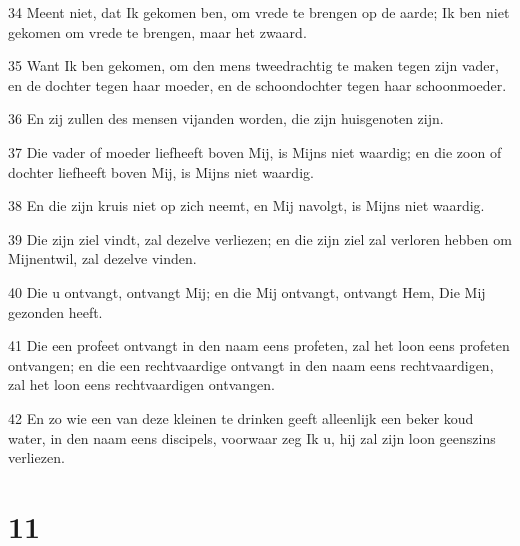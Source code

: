 \par 34 Meent niet, dat Ik gekomen ben, om vrede te brengen op de aarde; Ik ben niet gekomen om vrede te brengen, maar het zwaard.
\par 35 Want Ik ben gekomen, om den mens tweedrachtig te maken tegen zijn vader, en de dochter tegen haar moeder, en de schoondochter tegen haar schoonmoeder.
\par 36 En zij zullen des mensen vijanden worden, die zijn huisgenoten zijn.
\par 37 Die vader of moeder liefheeft boven Mij, is Mijns niet waardig; en die zoon of dochter liefheeft boven Mij, is Mijns niet waardig.
\par 38 En die zijn kruis niet op zich neemt, en Mij navolgt, is Mijns niet waardig.
\par 39 Die zijn ziel vindt, zal dezelve verliezen; en die zijn ziel zal verloren hebben om Mijnentwil, zal dezelve vinden.
\par 40 Die u ontvangt, ontvangt Mij; en die Mij ontvangt, ontvangt Hem, Die Mij gezonden heeft.
\par 41 Die een profeet ontvangt in den naam eens profeten, zal het loon eens profeten ontvangen; en die een rechtvaardige ontvangt in den naam eens rechtvaardigen, zal het loon eens rechtvaardigen ontvangen.
\par 42 En zo wie een van deze kleinen te drinken geeft alleenlijk een beker koud water, in den naam eens discipels, voorwaar zeg Ik u, hij zal zijn loon geenszins verliezen.

\chapter{11}

